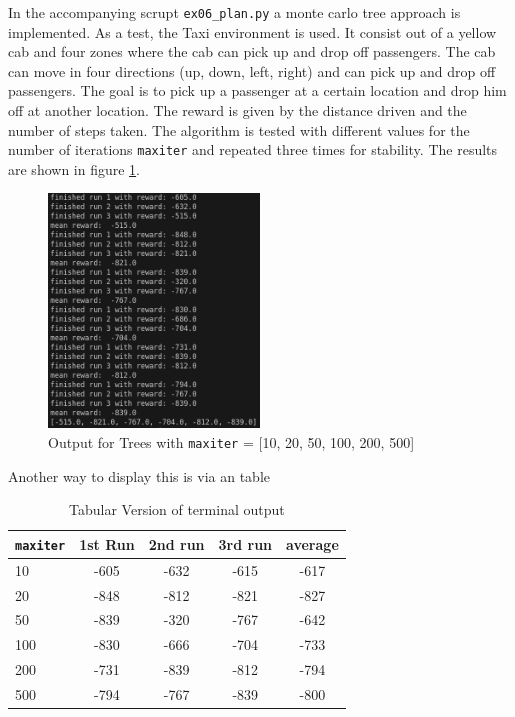 \documentclass{article}
\begin{document}
In the accompanying scrupt \texttt{ex06\_plan.py} a monte carlo tree approach is implemented. As a test, the Taxi environment is used. It consist out of a yellow cab and four zones where the cab can pick up and drop off passengers. The cab can move in four directions (up, down, left, right) and can pick up and drop off passengers. The goal is to pick up a passenger at a certain location and drop him off at another location. The reward is given by the distance driven and the number of steps taken. The algorithm is tested with different values for the number of iterations \texttt{maxiter} and repeated three times for stability. The results are shown in figure \ref{fig:terminal}. 
\begin{figure}[H]
\centering
\includegraphics[width=0.5\textwidth]{images/terminal.png}
\caption{Output for Trees with \texttt{maxiter} = [10, 20, 50, 100, 200, 500]}
\label{fig:terminal}
\end{figure}
Another way to display this is via an table
\begin{table}[H]
\centering
\begin{tabular}{l|c|c|c|c}
\texttt{maxiter} & 1st Run & 2nd run & 3rd run & average  \\  \hline
 10& -605 &  -632 & -615 & -617 \\  \hline 
 20& -848 & -812 & -821 & -827  \\ \hline
 50& -839 & -320 & -767 & -642  \\ \hline
 100&-830& -666 & -704 & -733  \\ \hline
 200&-731&-839&-812&-794  \\ \hline
 500& -794&-767&-839 & -800
\end{tabular}
\caption{Tabular Version of terminal output}
\label{tab:t1}
\end{table}
\end{document}
